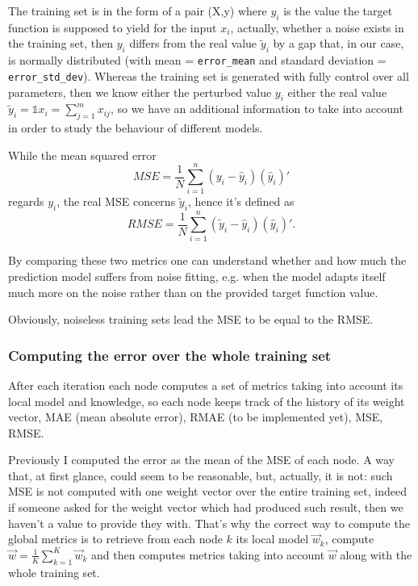 \documentclass[11pt]{article}
\begin{document}
The training set is in the form of a pair (X,y) where \(y_i\) is the
value the target function is supposed to yield for the input \(x_i\),
actually, whether a noise exists in the training set, then \(y_i\)
differs from the real value \(\tilde{y}_i\) by a gap that, in our case,
is normally distributed (with mean = \texttt{error\_mean} and standard
deviation = \texttt{error\_std\_dev}). Whereas the training set is
generated with fully control over all parameters, then we know either
the perturbed value \(y_i\) either the real value
\(\tilde{y}_i=\mathbb{1} x_i=\sum_{j=1}^{m}x_{ij}\), so we have an
additional information to take into account in order to study the
behaviour of different models.

While the mean squared error
\[MSE = \frac{1}{N} \sum_{i=1}^{n} (y_i - \hat{y}_i) (\hat{y}_i)'\]
regards \(y_i\), the real MSE concerns \(\tilde{y}_i\), hence it's
defined as
\[RMSE = \frac{1}{N} \sum_{i=1}^{n} (\tilde{y}_i - \hat{y}_i) (\hat{y}_i)'.\]

By comparing these two metrics one can understand whether and how much
the prediction model suffers from noise fitting, e.g. when the model
adapts itself much more on the noise rather than on the provided target
function value.

Obviously, noiseless training sets lead the MSE to be equal to the RMSE.

    \subsubsection{Computing the error over the whole training
set}\label{computing-the-error-over-the-whole-training-set}

After each iteration each node computes a set of metrics taking into
account its local model and knowledge, so each node keeps track of the
history of its weight vector, MAE (mean absolute error), RMAE (to be
implemented yet), MSE, RMSE.

Previously I computed the error as the mean of the MSE of each node. A
way that, at first glance, could seem to be reasonable, but, actually,
it is not: such MSE is not computed with one weight vector over the
entire training set, indeed if someone asked for the weight vector which
had produced such result, then we haven't a value to provide they with.
That's why the correct way to compute the global metrics is to retrieve
from each node \(k\) its local model \(\vec{w}_{k}\), compute
\(\vec{w} = \frac{1}{K}\sum_{k=1}^{K}\vec{w}_k\) and then computes
metrics taking into account \(\vec{w}\) along with the whole training
set.
\end{document}
